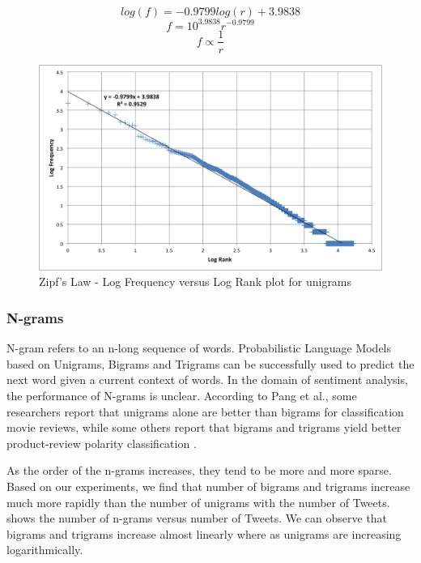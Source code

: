 \begin{equation}
log( f ) = -0.9799 log( r ) + 3.9838
\end{equation}
\begin{equation}
f = 10^{3.9838} r^{-0.9799}
\end{equation}
\begin{equation}
f \propto \frac{1}{r}
\end{equation}

\begin{figure}[h!]
\centering
\includegraphics[width=\textwidth]{img/zipfs_law.png}
\caption{Zipf's Law - Log Frequency versus Log Rank plot for unigrams}
\label{fig:zipf}
\end{figure}


\subsubsection{N-grams}
N-gram refers to an n-long sequence of words. Probabilistic Language Models based on Unigrams, Bigrams and Trigrams can be successfully used to predict the next word given a current context of words. In the domain of sentiment analysis, the performance of N-grams is unclear. According to Pang et al., some researchers report that unigrams alone are better than bigrams for classification movie reviews, while some others report that bigrams and trigrams yield better product-review polarity classification \cite{survey}.

As the order of the n-grams increases, they tend to be more and more sparse. Based on our experiments, we find that number of bigrams and trigrams increase much more rapidly than the number of unigrams with the number of Tweets.  shows the number of n-grams versus number of Tweets. We can observe that bigrams and trigrams increase almost linearly where as unigrams are increasing logarithmically.

